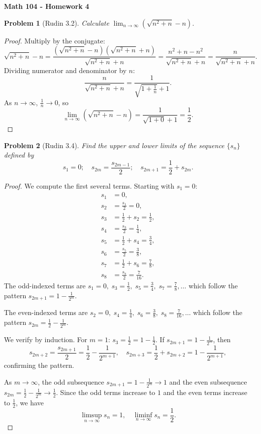 \documentclass[12 pt]{article}        	%
\newtheorem{prob}{Problem}
\begin{document}
\begin{center}
    \textbf{\Large Math 104 - Homework 4}\\
\end{center}

\begin{prob}[Rudin 3.2]
Calculate $\displaystyle\lim_{n \to \infty}\left(\sqrt{n^2 + n} - n\right)$.
\end{prob}
\begin{proof}
Multiply by the conjugate:
\[
\sqrt{n^2 + n} - n = \frac{(\sqrt{n^2+n} - n)(\sqrt{n^2+n} + n)}{\sqrt{n^2+n} + n} = \frac{n^2 + n - n^2}{\sqrt{n^2+n} + n} = \frac{n}{\sqrt{n^2+n} + n}.
\]
Dividing numerator and denominator by $n$:
\[
\frac{n}{\sqrt{n^2+n} + n} = \frac{1}{\sqrt{1 + \frac{1}{n}} + 1}.
\]
As $n \to \infty$, $\frac{1}{n} \to 0$, so
\[
\lim_{n \to \infty} \left(\sqrt{n^2+n} - n\right) = \frac{1}{\sqrt{1+0} + 1} = \frac{1}{2}.
\]
\end{proof}

\begin{prob}[Rudin 3.4]
Find the upper and lower limits of the sequence $\{s_n\}$ defined by
\[
s_1 = 0; \quad s_{2m} = \frac{s_{2m-1}}{2}; \quad s_{2m+1} = \frac{1}{2} + s_{2m}.
\]
\end{prob}
\begin{proof}
We compute the first several terms. Starting with $s_1 = 0$:
\begin{align*}
s_1 &= 0, \\
s_2 &= \frac{s_1}{2} = 0, \\
s_3 &= \frac{1}{2} + s_2 = \frac{1}{2}, \\
s_4 &= \frac{s_3}{2} = \frac{1}{4}, \\
s_5 &= \frac{1}{2} + s_4 = \frac{3}{4}, \\
s_6 &= \frac{s_5}{2} = \frac{3}{8}, \\
s_7 &= \frac{1}{2} + s_6 = \frac{7}{8}, \\
s_8 &= \frac{s_7}{2} = \frac{7}{16}.
\end{align*}
The odd-indexed terms are $s_1 = 0,\; s_3 = \frac{1}{2},\; s_5 = \frac{3}{4},\; s_7 = \frac{7}{8}, \ldots$ which follow the pattern $s_{2m+1} = 1 - \frac{1}{2^m}$.

The even-indexed terms are $s_2 = 0,\; s_4 = \frac{1}{4},\; s_6 = \frac{3}{8},\; s_8 = \frac{7}{16}, \ldots$ which follow the pattern $s_{2m} = \frac{1}{2} - \frac{1}{2^m}$.

We verify by induction. For $m = 1$: $s_3 = \frac{1}{2} = 1 - \frac{1}{2}$. If $s_{2m+1} = 1 - \frac{1}{2^m}$, then
\[
s_{2m+2} = \frac{s_{2m+1}}{2} = \frac{1}{2} - \frac{1}{2^{m+1}}, \quad s_{2m+3} = \frac{1}{2} + s_{2m+2} = 1 - \frac{1}{2^{m+1}},
\]
confirming the pattern.

As $m \to \infty$, the odd subsequence $s_{2m+1} = 1 - \frac{1}{2^m} \to 1$ and the even subsequence $s_{2m} = \frac{1}{2} - \frac{1}{2^m} \to \frac{1}{2}$. Since the odd terms increase to $1$ and the even terms increase to $\frac{1}{2}$, we have
\[
\limsup_{n \to \infty} s_n = 1, \quad \liminf_{n \to \infty} s_n = \frac{1}{2}.
\]
\end{proof}
\end{document}
